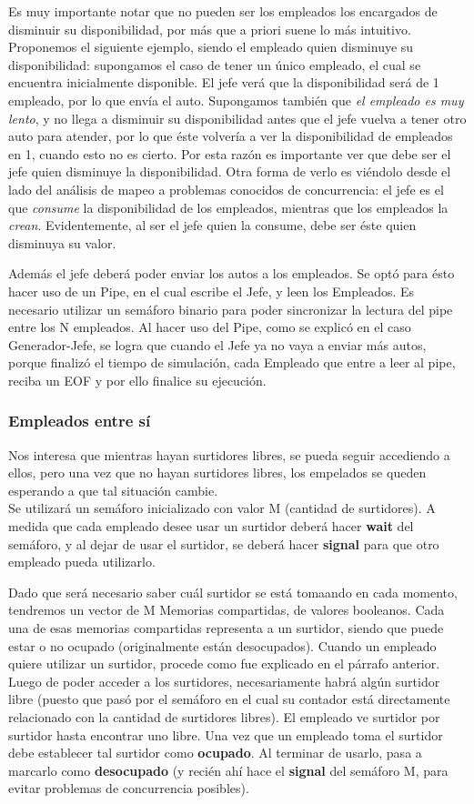 \documentclass[a4paper,12pt]{article}
\begin{document}
Es muy importante notar que no pueden ser los empleados los encargados de disminuir su disponibilidad, por más que a priori suene lo más intuitivo.
Proponemos el siguiente ejemplo, siendo el empleado quien disminuye su disponibilidad: supongamos el caso de tener un único empleado, el cual se encuentra inicialmente disponible. El jefe verá que la disponibilidad será de 1 empleado, por lo que envía el auto. Supongamos también que \textit{el empleado es muy lento}, y no llega a disminuir su disponibilidad antes que el jefe vuelva a tener otro auto para atender, por lo que éste volvería a ver la disponibilidad de empleados en 1, cuando esto no es cierto. Por esta razón es importante ver que debe ser el jefe quien disminuye la disponibilidad. Otra forma de verlo es viéndolo desde el lado del análisis de mapeo a problemas conocidos de concurrencia: el jefe es el que \textit{consume} la disponibilidad de los empleados, mientras que los empleados la \textit{crean}. Evidentemente, al ser el jefe quien la consume, debe ser éste quien disminuya su valor.

Además el jefe deberá poder enviar los autos a los empleados. Se optó para ésto hacer uso de un Pipe, en el cual escribe el Jefe, y leen los Empleados. Es necesario utilizar un semáforo binario para poder sincronizar la lectura del pipe entre los N empleados.
Al hacer uso del Pipe, como se explicó en el caso Generador-Jefe, se logra que cuando el Jefe ya no vaya a enviar más autos, porque finalizó el tiempo de simulación, cada Empleado que entre a leer al pipe, reciba un EOF y por ello finalice su ejecución.


\subsubsection{Empleados entre sí}
Nos interesa que mientras hayan surtidores libres, se pueda seguir accediendo a ellos, pero una vez que no hayan surtidores libres, los empelados se queden esperando a que tal situación cambie.\\
Se utilizará un semáforo inicializado con valor M (cantidad de surtidores). A medida que cada empleado desee usar un surtidor deberá hacer \textbf{wait} del semáforo, y al dejar de usar el surtidor, se deberá hacer \textbf{signal} para que otro empleado pueda utilizarlo.

Dado que será necesario saber cuál surtidor se está tomaando en cada momento, tendremos un vector de M Memorias compartidas, de valores booleanos. Cada una de esas memorias compartidas representa a un surtidor, siendo que puede estar o no ocupado (originalmente están desocupados). Cuando un empleado quiere utilizar un surtidor, procede como fue explicado en el párrafo anterior. Luego de poder acceder a los surtidores, necesariamente habrá algún surtidor libre (puesto que pasó por el semáforo en el cual su contador está directamente relacionado con la cantidad de surtidores libres). El empleado ve surtidor por surtidor hasta encontrar uno libre. Una vez que un empleado toma el surtidor debe establecer tal surtidor como \textbf{ocupado}. Al terminar de usarlo, pasa a marcarlo como \textbf{desocupado} (y recién ahí hace el \textbf{signal} del semáforo M, para evitar problemas de concurrencia posibles).
\end{document}

